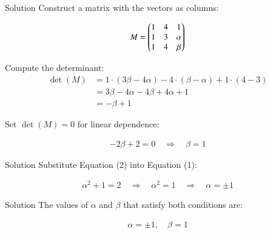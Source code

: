 \documentclass{beamer}
\begin{document}
\begin{frame}{Solution}
Construct a matrix with the vectors as columns:


\begin{align}
M = \begin{pmatrix}
1 & 4 & 1 \\
1 & 3 & \alpha \\
1 & 4 & \beta
\end{pmatrix}
\end{align}



Compute the determinant:
\begin{align*}
\det(M) &= 1 \cdot (3\beta - 4\alpha) - 4 \cdot (\beta - \alpha) + 1 \cdot (4 - 3) \\
&= 3\beta - 4\alpha - 4\beta + 4\alpha + 1 \\
&= -\beta + 1
\end{align*}

Set $\det(M) = 0$ for linear dependence:


\begin{align}
-2\beta + 2 = 0 \quad \Rightarrow \quad \beta = 1 \tag{2}
\end{align}
\end{frame}

\begin{frame}{Solution}
Substitute Equation (2) into Equation (1):


\begin{align}
\alpha^2 + 1 = 2 \quad \Rightarrow \quad \alpha^2 = 1 \quad \Rightarrow \quad \alpha = \pm1
\end{align}
\end{frame}

\begin{frame}{Solution}
The values of $\alpha$ and $\beta$ that satisfy both conditions are:


\begin{align}
\boxed{\alpha = \pm1, \quad \beta = 1}
\end{align}

\end{frame}
\end{document}

